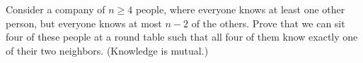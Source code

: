 Consider a company of $n\ge 4$ people, where everyone knows at least one other person, but everyone knows at most $n-2$ of the others. Prove that we can sit four of these people at a round table such that all four of them know exactly one of their two neighbors. (Knowledge is mutual.)